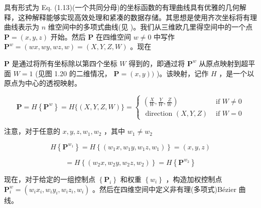 \documentclass[../main.tex]{subfiles}
\begin{document}
\noindent\begin{minipage}{\linewidth}
具有形式为 Eq. (1.13)(一个共同分母)的坐标函数的有理曲线具有优雅的几何解释，这种解释能够实现高效处理和紧凑的数据存储。其思想是使用齐次坐标将有理曲线表示为 \(n\) 维空间中的多项式曲线(见 \cite{Robe65,Ries81,Patt85})。我们从三维欧几里得空间中的一个点 \(\mathbf{P} = \left( {x,y,z}\right)\) 开始。然后 \(\mathbf{P}\) 在四维空间 \(w \neq  0\) 中写作 \({\mathbf{P}}^{w} = \left( {{wx},{wy},{wz},w}\right)  = \left( {X,Y,Z,W}\right)\) 。现在

\(\mathbf{P}\) 是通过将所有坐标除以第四个坐标 \(W\) 得到的，即通过将 \({\mathbf{P}}^{w}\) 从原点映射到超平面 \(W = 1\) (见图 1.20 的二维情况， \(\mathbf{P} = \left( {x,y}\right) )\) )。该映射，记作 \(H\) ，是一个以原点为中心的透视映射。

\[
\mathbf{P} = H\left\{  {\mathbf{P}}^{w}\right\}   = H\{ \left( {X,Y,Z,W}\right) \}  = \left\{  \begin{array}{ll} \left( {\frac{X}{W},\frac{Y}{W},\frac{Z}{W}}\right) & \text{ if }W \neq  0 \\  \text{ direction }\left( {X,Y,Z}\right) & \text{ if }W = 0 \end{array}\right.  \tag{1.16}
\]

\begin{center}
\begin{minipage}{12cm}
\centering
{}
\captionsetup{font=small,skip=6pt,justification=centering}
\end{minipage}
\end{center}
\end{minipage}
\par\medskip

注意，对于任意的 \(x,y,z,{w}_{1},{w}_{2}\) ，其中 \({w}_{1} \neq  {w}_{2}\)

\[
H\left\{  {\mathbf{P}}^{{w}_{1}}\right\}   = H\left\{  \left( {{w}_{1}x,{w}_{1}y,{w}_{1}z,{w}_{1}}\right) \right\}   = \left( {x,y,z}\right)
\]

\[
= H\left\{  \left( {{w}_{2}x,{w}_{2}y,{w}_{2}z,{w}_{2}}\right) \right\}   = H\left\{  {\mathbf{P}}^{{w}_{2}}\right\}
\]

现在，对于给定的一组控制点 \(\left\{  {\mathbf{P}}_{i}\right\}\) 和权重 \(\left\{  {w}_{i}\right\}\) ，构造加权控制点 \({\mathbf{P}}_{i}^{w} = \left( {{w}_{i}{x}_{i},{w}_{i}{y}_{i},{w}_{i}{z}_{i},{w}_{i}}\right)\) 。然后在四维空间中定义非有理(多项式)Bézier 曲线。
\end{document}
